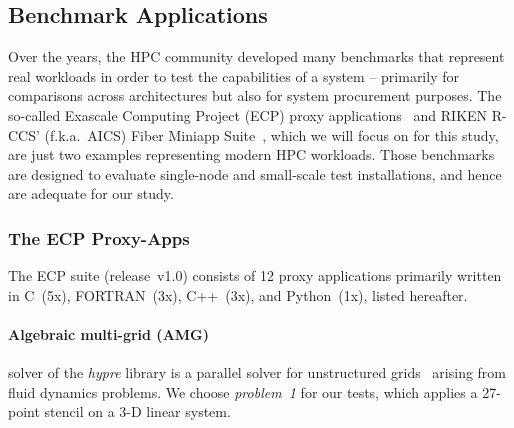 \subsection{Benchmark Applications}\label{ssec:bm}




Over the years, the HPC community developed many benchmarks
that represent real workloads in order to test the capabilities of a system
-- primarily for comparisons across architectures but also for system procurement purposes.
The so-called Exascale Computing Project (ECP) proxy applications~\cite{noauthor_ecp_2018} and
RIKEN R-CCS' (f.k.a.~AICS) Fiber Miniapp Suite~\cite{riken_aics_fiber_2015}, which we will focus
on for this study, are just two examples representing modern HPC workloads.
Those benchmarks are designed to evaluate single-node and small-scale test installations,
and hence are adequate for our study.


\subsubsection{The ECP Proxy-Apps}\label{ssec:ecp}
The ECP suite (release~v1.0) consists of 12 proxy applications primarily written in C~(5x),
FORTRAN~(3x), C++~(3x), and Python~(1x), listed hereafter.

\paragraph{Algebraic multi-grid (AMG)} solver of the \textit{hypre} library is a parallel solver
for unstructured grids~\cite{park_high-performance_2015} arising from fluid dynamics problems.
We choose \textit{problem~1} for our tests, which applies a 27-point stencil on a 3-D linear system.

